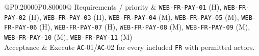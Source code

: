 \begin{longtable}{@{}P{0.20000\SRSWidth}P{0.80000\SRSWidth}@{}}
Requirements /\allowbreak{} priority & \texttt{WEB-\allowbreak{}FR-\allowbreak{}PAY-\allowbreak{}01} (H), \texttt{WEB-\allowbreak{}FR-\allowbreak{}PAY-\allowbreak{}02} (H), \texttt{WEB-\allowbreak{}FR-\allowbreak{}PAY-\allowbreak{}03} (H), \texttt{WEB-\allowbreak{}FR-\allowbreak{}PAY-\allowbreak{}04} (M), \texttt{WEB-\allowbreak{}FR-\allowbreak{}PAY-\allowbreak{}05} (M), \texttt{WEB-\allowbreak{}FR-\allowbreak{}PAY-\allowbreak{}06} (H), \texttt{WEB-\allowbreak{}FR-\allowbreak{}PAY-\allowbreak{}07} (H), \texttt{WEB-\allowbreak{}FR-\allowbreak{}PAY-\allowbreak{}08} (M), \texttt{WEB-\allowbreak{}FR-\allowbreak{}PAY-\allowbreak{}09} (M), \texttt{WEB-\allowbreak{}FR-\allowbreak{}PAY-\allowbreak{}10} (M), \texttt{WEB-\allowbreak{}FR-\allowbreak{}PAY-\allowbreak{}11} (M) \\[3pt]
Acceptance & Execute \texttt{AC}-01/\allowbreak{}\texttt{AC}-02 for every included \texttt{FR} with permitted actors. \\[3pt]
\end{longtable}
\endgroup

